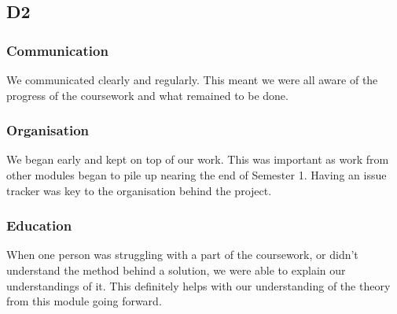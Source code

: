 \subsection*{D2}
    \subsubsection*{Communication} We communicated clearly and regularly. This meant we were all aware of the progress of the coursework and what remained to be done. 
    \subsubsection*{Organisation} We began early and kept on top of our work. This was important as work from other modules began to pile up nearing the end of Semester 1. Having an issue tracker was key to the organisation behind the project.
    \subsubsection*{Education} When one person was struggling with a part of the coursework, or didn't understand the method behind a solution, we were able to explain our understandings of it. This definitely helps with our understanding of the theory from this module going forward.
